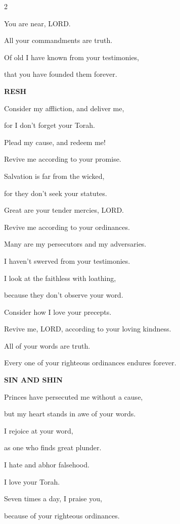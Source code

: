 \begin{multicols}{2}
	
	\myverse{}You are near, LORD.
	
	All your commandments are truth.
	
	
	\myverse{}Of old I have known from your testimonies,
	
	that you have founded them forever.
	
	\vspace{\baselineskip}
	\textbf{RESH}
	
	
	\myverse{}Consider my affliction, and deliver me,
	
	for I don’t forget your Torah.
	
	
	\myverse{}Plead my cause, and redeem me!
	
	Revive me according to your promise.
	
	
	\myverse{}Salvation is far from the wicked,
	
	for they don’t seek your statutes.
	
	
	\myverse{}Great are your tender mercies, LORD.
	
	Revive me according to your ordinances.
	
	
	\myverse{}Many are my persecutors and my adversaries.
	
	I haven’t swerved from your testimonies.
	
	
	\myverse{}I look at the faithless with loathing,
	
	because they don’t observe your word.
	
	
	\myverse{}Consider how I love your precepts.
	
	Revive me, LORD, according to your loving kindness.
	
	
	\myverse{}All of your words are truth.
	
	Every one of your righteous ordinances endures forever.
	
	\vspace{\baselineskip}
	
	\textbf{SIN AND SHIN}
	
	
	\myverse{}Princes have persecuted me without a cause,
	
	but my heart stands in awe of your words.
	
	
	\myverse{}I rejoice at your word,
	
	as one who finds great plunder.
	
	
	\myverse{}I hate and abhor falsehood.
	
	I love your Torah.
	
	
	\myverse{}Seven times a day, I praise you,
	
	because of your righteous ordinances.
	

\end{multicols}
